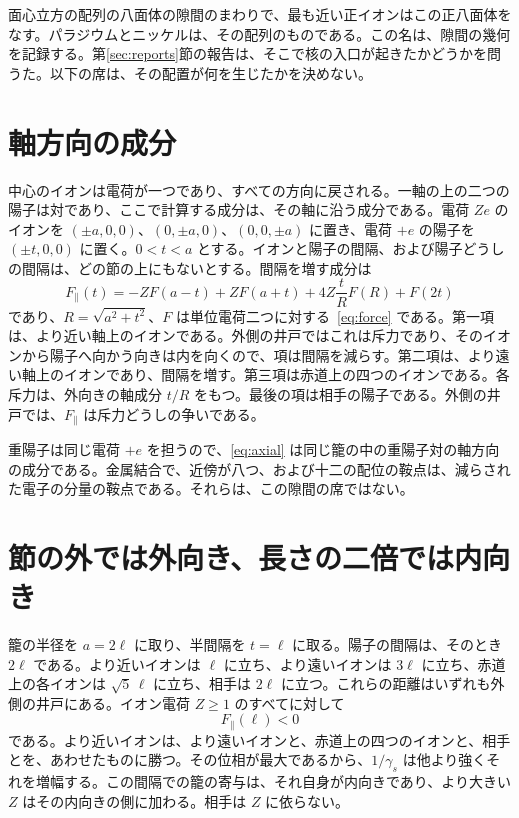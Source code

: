 \documentclass[a4paper]{article}
\begin{document}
面心立方の配列の八面体の隙間のまわりで、最も近い正イオンはこの正八面体をなす。パラジウムとニッケルは、その配列のものである。この名は、隙間の幾何を記録する。第\ref{sec:reports}節の報告は、そこで核の入口が起きたかどうかを問うた。以下の席は、その配置が何を生じたかを決めない。

\section{軸方向の成分}
\label{sec:axis}

中心のイオンは電荷が一つであり、すべての方向に戻される。一軸の上の二つの陽子は対であり、ここで計算する成分は、その軸に沿う成分である。電荷 \(Ze\) のイオンを \((\pm a,0,0)\)、\((0,\pm a,0)\)、\((0,0,\pm a)\) に置き、電荷 \(+e\) の陽子を \((\pm t,0,0)\) に置く。\(0<t<a\) とする。イオンと陽子の間隔、および陽子どうしの間隔は、どの節の上にもないとする。間隔を増す成分は
\begin{equation}
\label{eq:axial}
F_{\parallel}(t)
=
-Z F(a-t)+Z F(a+t)
+4Z\frac{t}{R}F(R)
+F(2t)
\end{equation}
であり、\(R=\sqrt{a^{2}+t^{2}}\)、\(F\) は単位電荷二つに対する~\eqref{eq:force} である。第一項は、より近い軸上のイオンである。外側の井戸ではこれは斥力であり、そのイオンから陽子へ向かう向きは内を向くので、項は間隔を減らす。第二項は、より遠い軸上のイオンであり、間隔を増す。第三項は赤道上の四つのイオンである。各斥力は、外向きの軸成分 \(t/R\) をもつ。最後の項は相手の陽子である。外側の井戸では、\(F_{\parallel}\) は斥力どうしの争いである。

重陽子は同じ電荷 \(+e\) を担うので、\eqref{eq:axial} は同じ籠の中の重陽子対の軸方向の成分である。金属結合で、近傍が八つ、および十二の配位の鞍点は、減らされた電子の分量の鞍点である。それらは、この隙間の席ではない。

\section{節の外では外向き、長さの二倍では内向き}
\label{sec:seat}

籠の半径を \(a=2\ell\) に取り、半間隔を \(t=\ell\) に取る。陽子の間隔は、そのとき \(2\ell\) である。より近いイオンは \(\ell\) に立ち、より遠いイオンは \(3\ell\) に立ち、赤道上の各イオンは \(\sqrt{5}\,\ell\) に立ち、相手は \(2\ell\) に立つ。これらの距離はいずれも外側の井戸にある。イオン電荷 \(Z\ge 1\) のすべてに対して
\begin{equation}
\label{eq:inward}
F_{\parallel}(\ell)<0
\end{equation}
である。より近いイオンは、より遠いイオンと、赤道上の四つのイオンと、相手とを、あわせたものに勝つ。その位相が最大であるから、\(1/\gamma_s\) は他より強くそれを増幅する。この間隔での籠の寄与は、それ自身が内向きであり、より大きい \(Z\) はその内向きの側に加わる。相手は \(Z\) に依らない。
\end{document}

